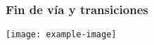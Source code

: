\subsubsection{Fin de vía y transiciones}

\lipsum[1]

\lipsum[1]
\texttt{[image: example-image]}
\lipsum[1]